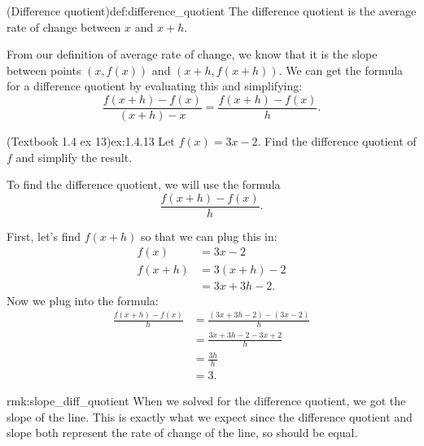 \documentclass{article}
\begin{document}
\begin{definition}{(Difference quotient)}{def:difference_quotient}
    The difference quotient is the average rate of change between $x$ and $x+h$. 
    
    From our definition of average rate of change, we know that it is the slope between points $(x,f(x))$ and $(x+h,f(x+h))$. We can get the formula for a difference quotient by evaluating this and simplifying:
    \[\frac{f(x+h)-f(x)}{(x+h)-x}=\boxed{\frac{f(x+h)-f(x)}{h}}.\]
\end{definition}

\begin{example}{(Textbook 1.4 ex 13)}{ex:1.4.13}
    Let $f(x)=3x-2$.
    Find the difference quotient of $f$ and simplify the result.
\end{example}
\begin{solution}
    To find the difference quotient, we will use the formula \[\frac{f(x+h)-f(x)}{h}.\]

    First, let's find $f(x+h)$ so that we can plug this in:
    \begin{align*}
        f(x)&=3x-2\\
        f(x+h)&=3(x+h)-2\\
        &=3x+3h-2.
    \end{align*}
    Now we plug into the formula:
    \begin{align*}
        \frac{f(x+h)-f(x)}{h}&=\frac{(3x+3h-2)-(3x-2)}{h}\\
        &=\frac{3x+3h-2-3x+2}{h}\\
        &=\frac{3h}{h}\\
        &=3.
    \end{align*}
\end{solution}

\begin{remark}{}{rmk:slope_diff_quotient}
    When we solved for the difference quotient, we got the slope of the line. This is exactly what we expect since the difference quotient and slope both represent the rate of change of the line, so should be equal.
\end{remark}
\end{document}
